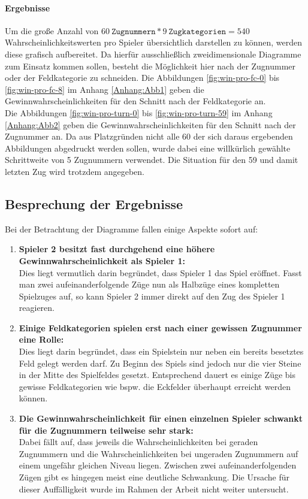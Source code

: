\paragraph{Ergebnisse}
Um die große Anzahl von $60\ \mathtt{Zugnummern} * 9\ \mathtt{Zugkategorien} = 540$ Wahrscheinlichkeitswerten pro Spieler übersichtlich darstellen zu können, werden diese grafisch aufbereitet. Da hierfür ausschließlich zweidimensionale Diagramme zum Einsatz kommen sollen, besteht die Möglichkeit hier nach der Zugnummer oder der Feldkategorie zu schneiden. Die Abbildungen \ref{fig:win-pro-fc-0} bis \ref{fig:win-pro-fc-8} im Anhang \ref{Anhang:Abb1} geben die Gewinnwahrscheinlichkeiten für den Schnitt nach der Feldkategorie an.
\\Die Abbildungen \ref{fig:win-pro-turn-0} bis \ref{fig:win-pro-turn-59} im Anhang \ref{Anhang:Abb2} geben die Gewinnwahrscheinlichkeiten für den Schnitt nach der Zugnummer an. Da aus Platzgründen nicht alle 60 der sich daraus ergebenden Abbildungen abgedruckt werden sollen, wurde dabei eine willkürlich gewählte Schrittweite von 5 Zugnummern verwendet. Die Situation für den 59 und damit letzten Zug wird trotzdem angegeben.

\subsection{Besprechung der Ergebnisse}
Bei der Betrachtung der Diagramme fallen einige Aspekte sofort auf:
\begin{enumerate}
\item \textbf{Spieler 2 besitzt fast durchgehend eine höhere Gewinnwahrscheinlichkeit als Spieler 1:}
\\Dies liegt vermutlich darin begründet, dass Spieler 1 das Spiel eröffnet. Fasst man zwei aufeinanderfolgende Züge nun als Halbzüge eines kompletten Spielzuges auf, so kann Spieler 2 immer direkt auf den Zug des Spieler 1 reagieren.
\item \textbf{Einige Feldkategorien spielen erst nach einer gewissen Zugnummer eine Rolle:}
\\Dies liegt darin begründet, dass ein Spielstein nur neben ein bereits besetztes Feld gelegt werden darf. Zu Beginn des Spiels sind jedoch nur die vier Steine in der Mitte des Spielfeldes gesetzt. Entsprechend dauert es einige Züge bis gewisse Feldkategorien wie bspw. die Eckfelder überhaupt erreicht werden können.
\item \textbf{Die Gewinnwahrscheinlichkeit für einen einzelnen Spieler schwankt für die Zugnummern teilweise sehr stark:}
\\Dabei fällt auf, dass jeweils die Wahrscheinlichkeiten bei geraden Zugnummern und die Wahrscheinlichkeiten bei ungeraden Zugnummern auf einem ungefähr gleichen Niveau liegen. Zwischen zwei aufeinanderfolgenden Zügen gibt es hingegen meist eine deutliche Schwankung. Die Ursache für dieser Auffälligkeit wurde im Rahmen der Arbeit nicht weiter untersucht. 
\end{enumerate}
